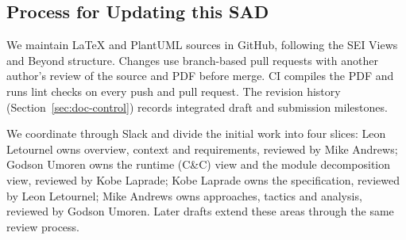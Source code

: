\subsection{Process for Updating this SAD}
\label{sec:update-process}
We maintain LaTeX and PlantUML sources in GitHub, following the SEI Views and Beyond
structure. Changes use branch-based pull requests with another author's review of the
source and PDF before merge. CI compiles the PDF and runs lint checks on every push
and pull request. The revision history (Section~\ref{sec:doc-control}) records
integrated draft and submission milestones.

We coordinate through Slack and divide the initial work into four slices: Leon
Letournel owns overview, context and requirements, reviewed by Mike Andrews; Godson
Umoren owns the runtime (C\&C) view and the module decomposition view, reviewed by Kobe Laprade; Kobe Laprade owns the
\IEP specification, reviewed by Leon Letournel; Mike Andrews owns approaches, tactics
and analysis, reviewed by Godson Umoren. Later drafts extend these areas through the same review process.
